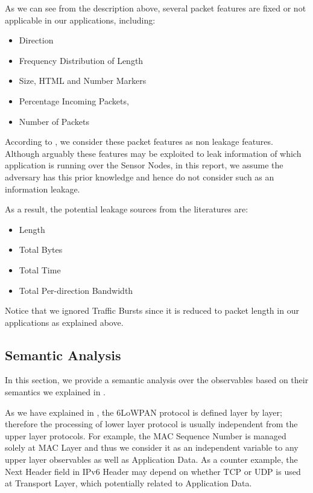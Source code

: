 As we can see from the description above, several packet features are fixed or not applicable in our applications, including:

\begin{itemize} 
	\item Direction
	\item Frequency Distribution of Length
	\item Size, HTML and Number Markers
	\item Percentage Incoming Packets,
	\item Number of Packets
\end{itemize}

According to , we consider these packet features as non leakage features. Although arguably these features may be exploited to leak information of which application is running over the Sensor Nodes, in this report, we assume the adversary has this prior knowledge and hence do not consider such as an information leakage.

As a result, the potential leakage sources from the literatures are:
\begin{itemize}
	\item Length
	\item Total Bytes
	\item Total Time
	\item Total Per-direction Bandwidth
\end{itemize}

Notice that we ignored Traffic Bursts since it is reduced to packet length in our applications as explained above.

\subsection{Semantic Analysis}

In this section, we provide a semantic analysis over the observables based on their semantics we explained in .

As we have explained in , the 6LoWPAN protocol is defined layer by layer; therefore the processing of lower layer protocol is usually independent from the upper layer protocols. For example, the MAC Sequence Number is managed solely at MAC Layer and thus we consider it as an independent variable to any upper layer observables as well as Application Data. As a counter example, the Next Header field in IPv6 Header may depend on whether TCP or UDP is used at Transport Layer, which potentially related to Application Data.

